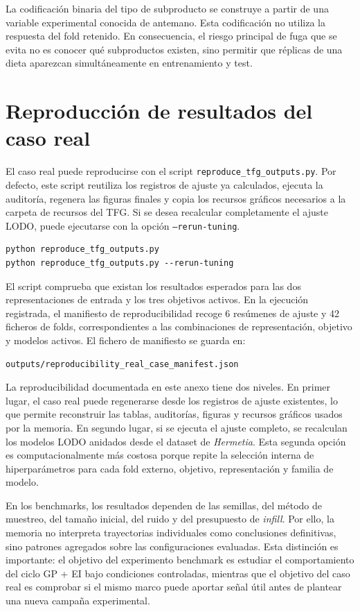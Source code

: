 La codificación binaria del tipo de subproducto se construye a partir de una variable experimental conocida de antemano. Esta codificación no utiliza la respuesta del fold retenido. En consecuencia, el riesgo principal de fuga que se evita no es conocer qué subproductos existen, sino permitir que réplicas de una dieta aparezcan simultáneamente en entrenamiento y test.

\section{Reproducción de resultados del caso real}
\label{app:reproduccion_caso_real}

El caso real puede reproducirse con el script \texttt{reproduce\_tfg\_outputs.py}. Por defecto, este script reutiliza los registros de ajuste ya calculados, ejecuta la auditoría, regenera las figuras finales y copia los recursos gráficos necesarios a la carpeta de recursos del TFG. Si se desea recalcular completamente el ajuste LODO, puede ejecutarse con la opción \texttt{--rerun-tuning}.

\begin{lstlisting}
python reproduce_tfg_outputs.py
python reproduce_tfg_outputs.py --rerun-tuning
\end{lstlisting}

El script comprueba que existan los resultados esperados para las dos representaciones de entrada y los tres objetivos activos. En la ejecución registrada, el manifiesto de reproducibilidad recoge 6 resúmenes de ajuste y 42 ficheros de folds, correspondientes a las combinaciones de representación, objetivo y modelos activos. El fichero de manifiesto se guarda en:

\begin{lstlisting}
outputs/reproducibility_real_case_manifest.json
\end{lstlisting}

La reproducibilidad documentada en este anexo tiene dos niveles. En primer lugar, el caso real puede regenerarse desde los registros de ajuste existentes, lo que permite reconstruir las tablas, auditorías, figuras y recursos gráficos usados por la memoria. En segundo lugar, si se ejecuta el ajuste completo, se recalculan los modelos LODO anidados desde el dataset de \textit{Hermetia}. Esta segunda opción es computacionalmente más costosa porque repite la selección interna de hiperparámetros para cada fold externo, objetivo, representación y familia de modelo.

En los benchmarks, los resultados dependen de las semillas, del método de muestreo, del tamaño inicial, del ruido y del presupuesto de \emph{infill}. Por ello, la memoria no interpreta trayectorias individuales como conclusiones definitivas, sino patrones agregados sobre las configuraciones evaluadas. Esta distinción es importante: el objetivo del experimento benchmark es estudiar el comportamiento del ciclo GP + EI bajo condiciones controladas, mientras que el objetivo del caso real es comprobar si el mismo marco puede aportar señal útil antes de plantear una nueva campaña experimental.
